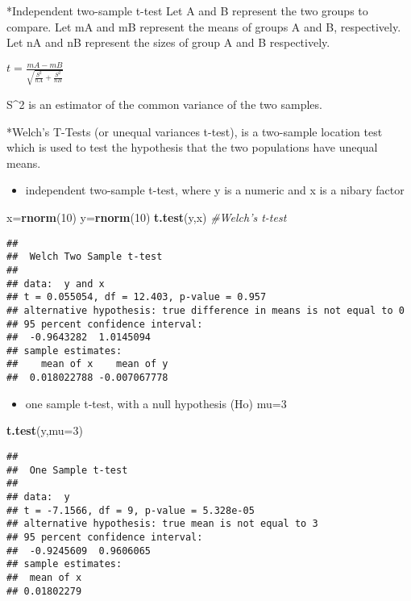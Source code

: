 \documentclass[]{article}
\newenvironment{Shaded}{\begin{snugshade}}{\end{snugshade}}
\newcommand{\CommentTok}[1]{\textcolor[rgb]{0.56,0.35,0.01}{\textit{#1}}}
\newcommand{\DataTypeTok}[1]{\textcolor[rgb]{0.13,0.29,0.53}{#1}}
\newcommand{\DecValTok}[1]{\textcolor[rgb]{0.00,0.00,0.81}{#1}}
\newcommand{\KeywordTok}[1]{\textcolor[rgb]{0.13,0.29,0.53}{\textbf{#1}}}
\newcommand{\NormalTok}[1]{#1}
\providecommand{\tightlist}{%
  \setlength{\itemsep}{0pt}\setlength{\parskip}{0pt}}
\begin{document}
*Independent two-sample t-test Let A and B represent the two groups to
compare. Let mA and mB represent the means of groups A and B,
respectively. Let nA and nB represent the sizes of group A and B
respectively.

\(t = \frac{mA - mB}{\sqrt{\frac{S^2}{nA} + \frac{S^2}{nB}}}\)

S\^{}2 is an estimator of the common variance of the two samples.

*Welch's T-Tests (or unequal variances t-test), is a two-sample location
test which is used to test the hypothesis that the two populations have
unequal means.

\begin{itemize}
\tightlist
\item
  independent two-sample t-test, where y is a numeric and x is a nibary
  factor
\end{itemize}

\begin{Shaded}
\begin{Highlighting}[]
\NormalTok{x=}\KeywordTok{rnorm}\NormalTok{(}\DecValTok{10}\NormalTok{)}
\NormalTok{y=}\KeywordTok{rnorm}\NormalTok{(}\DecValTok{10}\NormalTok{)}
\KeywordTok{t.test}\NormalTok{(y,x)  }\CommentTok{#Welch's t-test}
\end{Highlighting}
\end{Shaded}

\begin{verbatim}
## 
##  Welch Two Sample t-test
## 
## data:  y and x
## t = 0.055054, df = 12.403, p-value = 0.957
## alternative hypothesis: true difference in means is not equal to 0
## 95 percent confidence interval:
##  -0.9643282  1.0145094
## sample estimates:
##    mean of x    mean of y 
##  0.018022788 -0.007067778
\end{verbatim}

\begin{itemize}
\tightlist
\item
  one sample t-test, with a null hypothesis (Ho) mu=3
\end{itemize}

\begin{Shaded}
\begin{Highlighting}[]
\KeywordTok{t.test}\NormalTok{(y,}\DataTypeTok{mu=}\DecValTok{3}\NormalTok{) }
\end{Highlighting}
\end{Shaded}

\begin{verbatim}
## 
##  One Sample t-test
## 
## data:  y
## t = -7.1566, df = 9, p-value = 5.328e-05
## alternative hypothesis: true mean is not equal to 3
## 95 percent confidence interval:
##  -0.9245609  0.9606065
## sample estimates:
##  mean of x 
## 0.01802279
\end{verbatim}
\end{document}
